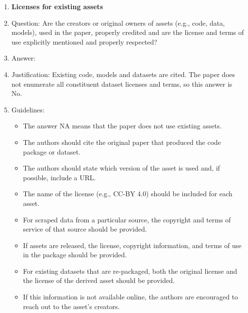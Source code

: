 \begin{enumerate}
\item {\bf Licenses for existing assets}
    \item[] Question: Are the creators or original owners of assets (e.g., code, data, models), used in the paper, properly credited and are the license and terms of use explicitly mentioned and properly respected?
    \item[] Answer: \answerNo{}
    \item[] Justification: Existing code, models and datasets are cited. The paper does not enumerate all constituent dataset licenses and terms, so this answer is No.
    \item[] Guidelines:
    \begin{itemize}
        \item The answer NA means that the paper does not use existing assets.
        \item The authors should cite the original paper that produced the code package or dataset.
        \item The authors should state which version of the asset is used and, if possible, include a URL.
        \item The name of the license (e.g., CC-BY 4.0) should be included for each asset.
        \item For scraped data from a particular source, the copyright and terms of service of that source should be provided.
        \item If assets are released, the license, copyright information, and terms of use in the package should be provided.
        \item For existing datasets that are re-packaged, both the original license and the license of the derived asset should be provided.
        \item If this information is not available online, the authors are encouraged to reach out to the asset's creators.
    \end{itemize}


\end{enumerate}
